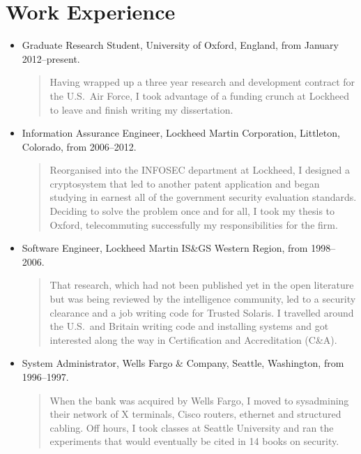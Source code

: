\documentclass[letterpaper]{article}
\begin{document}
\section*{Work Experience} %

\begin{itemize}
	\item Graduate Research Student, University of Oxford, England, from January 2012--present.

		\begin{quote}\vspace{-2mm}
			Having wrapped up a three year research and development contract for the U.S.\ Air
			Force, I took advantage of a funding crunch at Lockheed to leave and finish writing
			my dissertation.
		\end{quote}

	\item Information Assurance Engineer, Lockheed Martin Corporation, Littleton, Colorado, from
		2006--2012.

		\begin{quote}\vspace{-2mm}
			Reorganised into the INFOSEC department at Lockheed, I designed a cryptosystem that
			led to another patent application and began studying in earnest all of the government
			security evaluation standards.  Deciding to solve the problem once and for all, I
			took my thesis to Oxford, telecommuting successfully my responsibilities for the firm.
		\end{quote}

	\item Software Engineer, Lockheed Martin IS\&GS Western Region, from 1998--2006.

		\begin{quote}\vspace{-2mm}
			That research, which had not been published yet in the open literature but was being
			reviewed by the intelligence community, led to a security clearance and a job writing
			code for Trusted Solaris.  I travelled around the U.S.\ and Britain writing code and
			installing systems and got interested along the way in Certification and
			Accreditation (C\&A).
		\end{quote}

	\item System Administrator, Wells Fargo \& Company, Seattle, Washington, from  1996--1997.

		\begin{quote}\vspace{-2mm}
			When the bank was acquired by Wells Fargo, I moved to sysadmining their network of X
			terminals, Cisco routers, ethernet and structured cabling.  Off hours, I took classes
			at Seattle University and ran the experiments that would eventually be cited in 14
			books on security.
		\end{quote}


\end{itemize}
\end{document}
